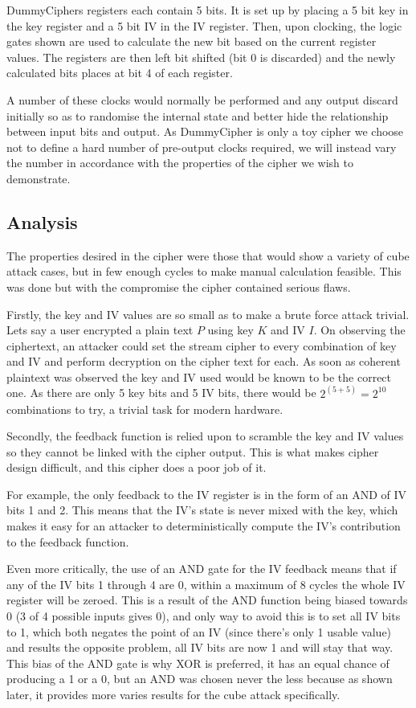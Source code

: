 \documentclass{report}
\let\Oldsubsection\subsection
\renewcommand{\subsection}{\FloatBarrier\Oldsubsection}
\begin{document}
DummyCiphers registers each contain 5 bits. It is set up by placing a 5 bit key in the key register and a 5 bit IV in the IV register. Then, upon clocking, the logic gates shown are used to calculate the new bit based on the current register values. The registers are then left bit shifted (bit 0 is discarded) and the newly calculated bits places at bit 4 of each register.

A number of these clocks would normally be performed and any output discard initially so as to randomise the internal state and better hide the relationship between input bits and output. As DummyCipher is only a toy cipher we choose not to define a hard number of pre-output clocks required, we will instead vary the number in accordance with the properties of the cipher we wish to demonstrate.

\subsection{Analysis}

The properties desired in the cipher were those that would show a variety of cube attack cases, but in few enough cycles to make manual calculation feasible. This was done but with the compromise the cipher contained serious flaws.

Firstly, the key and IV values are so small as to make a brute force attack trivial. Lets say a user encrypted a plain text $P$ using key $K$ and IV $I$. On observing the ciphertext, an attacker could set the stream cipher to every combination of key and IV and perform decryption on the cipher text for each. As soon as coherent plaintext was observed the key and IV used would be known to be the correct one. As there are only 5 key bits and 5 IV bits, there would be $2^(5+5) = 2^10$ combinations to try, a trivial task for modern hardware.

Secondly, the feedback function is relied upon to scramble the key and IV values so they cannot be linked with the cipher output. This is what makes cipher design difficult, and this cipher does a poor job of it.

For example, the only feedback to the IV register is in the form of an AND of IV bits 1 and 2. This means that the IV's state is never mixed with the key, which makes it easy for an attacker to deterministically compute the IV's contribution to the feedback function.

Even more critically, the use of an AND gate for the IV feedback means that if any  of the IV bits 1 through 4 are 0, within a maximum of 8 cycles the whole IV register will be zeroed. This is a result of the AND function being biased towards 0 (3 of 4 possible inputs gives 0), and only way to avoid this is to set all IV bits to 1, which both negates the point of an IV (since there's only 1 usable value) and results the opposite problem, all IV bits are now 1 and will stay that way. This bias of the AND gate is why XOR is preferred, it has an equal chance of producing a 1 or a 0, but an AND was chosen never the less because as shown later, it provides more varies results for the cube attack 
specifically.
\end{document}
